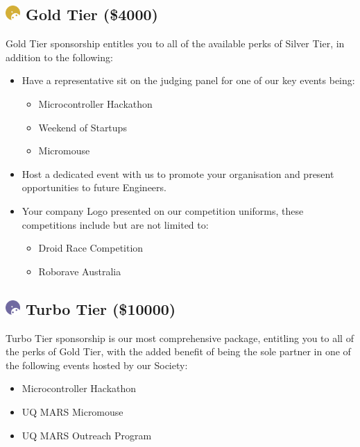\documentclass[a4paper,12pt]{report}
\begin{document}
\subsection*{
    \includegraphics[width=1em]{../assets/Sponsor Icons/Gold}
    \textcolor{sponsor_gold}{Gold Tier (\$4000)}
}
Gold Tier sponsorship entitles you to all of the available perks of Silver Tier, in addition to the following:
\begin{itemize}
    \item Have a representative sit on the judging panel for one of our key events being:
    
    \begin{itemize}
        \item Microcontroller Hackathon
        \item Weekend of Startups
        \item Micromouse
    \end{itemize}
    
    \item Host a dedicated event with us to promote your organisation and present opportunities to future Engineers.  
    
    \item Your company Logo presented on our competition uniforms, these competitions include but are not limited to: 
    \begin{itemize}
        \item Droid Race Competition
        \item Roborave Australia 
    \end{itemize}
\end{itemize}

\subsection*{
    \includegraphics[width=1em]{../assets/Sponsor Icons/Turbo.png}
    \textcolor{turbo_purple}{Turbo Tier (\$10000)}
}
Turbo Tier sponsorship is our most comprehensive package, entitling you to all of the perks of Gold Tier, with the added benefit of being the sole partner in one of the following events hosted by our Society:
\begin{itemize}
    \item Microcontroller Hackathon 
    \item UQ MARS Micromouse 
    \item UQ MARS Outreach Program 
\end{itemize}
\end{document}
